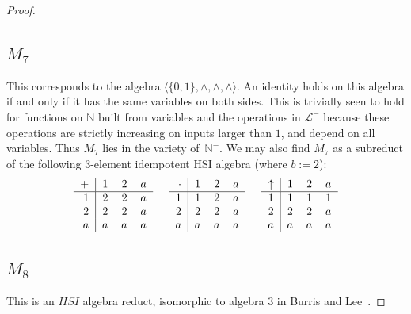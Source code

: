 \documentclass[eqnor,reqno]{amsart}
\theoremstyle{plain}
\theoremstyle{definition}
\begin{document}
\begin{proof}
\subsection{$M_7$} This corresponds to the algebra $\langle \{0,1\},\wedge,\wedge,\wedge\rangle$.  An identity holds on this algebra if and only if it has the same variables on both sides.  
This is trivially seen to hold for functions on $\mathbb{N}$ built from variables and the operations in $\mathscr{L}^-$ because these operations are strictly increasing on inputs larger than $1$, and depend on all variables.  
Thus $M_7$ lies in the variety of~$\mathbb{N}^-$.
We may also find $M_7$ as a subreduct of the following $3$-element idempotent HSI algebra (where $b:=2$):
\[
\begin{tabular}{r|rrr}
$+$ & $1$ & $2$ & $a$\\
\hline
    $1$ & $2$ & $2$ & $a$ \\
    $2$ & $2$ & $2$ & $a$ \\
    $a$ & $a$ & $a$ & $a$
\end{tabular} \hspace{.5cm}
\begin{tabular}{r|rrr}
$\cdot$ & $1$ & $2$ & $a$\\
\hline
    $1$ & $1$ & $2$ & $a$ \\
    $2$ & $2$ & $2$ & $a$ \\
    $a$ & $a$ & $a$ & $a$
\end{tabular} \hspace{.5cm}
\begin{tabular}{r|rrr}
$\uparrow$ & $1$ & $2$ & $a$\\
\hline
    $1$ & $1$ & $1$ & $1$ \\
    $2$ & $2$ & $2$ & $a$ \\
    $a$ & $a$ & $a$ & $a$
\end{tabular}
\]

\subsection{$M_8$}  This is an $HSI$ algebra reduct, isomorphic to algebra $3$ in Burris and Lee~\cite[Theorem~4.1]{burlee92}.


\end{proof}
\end{document}
